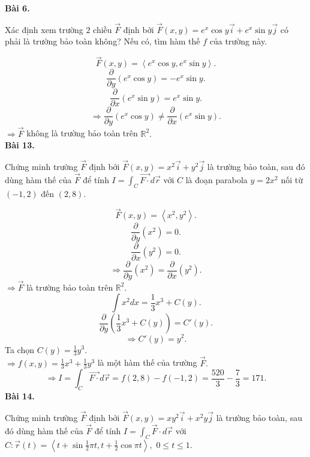 \documentclass[12pt,a4paper]{article}
\begin{document}
\textbf{Bài 6.}
\begin{mybox}
Xác định xem trường \(2\) chiều \(\overrightarrow{F}\) định bởi \(\overrightarrow F \left( {x,y} \right) = {e^x}\cos y\overrightarrow i  + {e^x}\sin y\overrightarrow j \) có phải là trường bảo toàn không? Nếu có, tìm hàm thế \(f\) của trường này.
\end{mybox}
\[\overrightarrow F \left( {x,y} \right) = \left\langle {{e^x}\cos y,{e^x}\sin y} \right\rangle .\]
\[\frac{\partial }{{\partial y}}\left( {{e^x}\cos y} \right) =  - {e^x}\sin y.\]
\[\frac{\partial }{{\partial x}}\left( {{e^x}\sin y} \right) = {e^x}\sin y.\]
\[ \Rightarrow \frac{\partial }{{\partial y}}\left( {{e^x}\cos y} \right) \ne \frac{\partial }{{\partial x}}\left( {{e^x}\sin y} \right).\]
\( \Rightarrow \overrightarrow F \) không là trường bảo toàn trên \(\mathbb{R}^2.\)\\
\textbf{Bài 13.}
\begin{mybox}
Chứng minh trường \(\overrightarrow{F}\) định bởi \(\overrightarrow{F} \left( {x,y} \right) = {x^2}\overrightarrow i  + {y^2}\overrightarrow j \) là trường bảo toàn, sau đó dùng hàm thế của \(\overrightarrow{F}\) để tính \(I = \int_C {\overrightarrow {F \cdot } d\overrightarrow r } \) với \(C\) là đoạn parabola \(y = 2{x^2}\) nối từ \(\left( { - 1,2} \right)\) đến \(\left( {2,8} \right).\)
\end{mybox}
\[\overrightarrow F \left( {x,y} \right) = \left\langle {{x^2},{y^2}} \right\rangle .\]
\[\frac{\partial }{{\partial y}}\left( {{x^2}} \right) = 0.\]
\[\frac{\partial }{{\partial x}}\left( {{y^2}} \right) = 0.\]
\[ \Rightarrow \frac{\partial }{{\partial y}}\left( {{x^2}} \right) = \frac{\partial }{{\partial x}}\left( {{y^2}} \right).\]
\( \Rightarrow \overrightarrow F \) là trường bảo toàn trên \(\mathbb{R}^2.\)
\[\int {{x^2}dx}  = \frac{1}{3}{x^3} + C\left( y \right).\]
\[\frac{\partial }{{\partial y}}\left( {\frac{1}{3}{x^3} + C\left( y \right)} \right) = C'\left( y \right).\]
\[ \Rightarrow C'\left( y \right) = {y^2}.\]
Ta chọn \(C\left( y \right) = \frac{1}{3}{y^3}.\)\\
\( \Rightarrow f\left( {x,y} \right) = \frac{1}{3}{x^3} + \frac{1}{3}{y^3}\) là một hàm thế của trường \(\overrightarrow{F}.\)
\[ \Rightarrow I = \int_C {\overrightarrow {F \cdot } d\overrightarrow r }  = f\left( {2,8} \right) - f\left( { - 1,2} \right) = \frac{{520}}{3} - \frac{7}{3} = 171.\]
\textbf{Bài 14.}
\begin{mybox}
Chứng minh trường \(\overrightarrow{F}\) định bởi \(\overrightarrow F \left( {x,y} \right) = x{y^2}\overrightarrow i  + {x^2}y\overrightarrow j \) là trường bảo toàn, sau đó dùng hàm thế của \(\overrightarrow{F}\) để tính \(I = \int_C {\overrightarrow F  \cdot d\overrightarrow r } \) với \(C:\overrightarrow r \left( t \right) = \left\langle {t + \sin \frac{1}{2}\pi t,t + \frac{1}{2}\cos \pi t} \right\rangle ,\) \(0 \leqslant t \leqslant 1.\)
\end{mybox}
\end{document}
